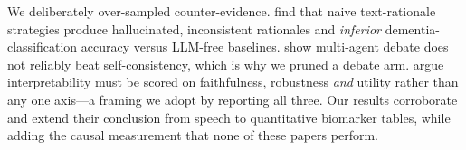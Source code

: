  We deliberately over-sampled counter-evidence.
\citet{anon2026dementiaspeech} find that naive text-rationale strategies produce hallucinated,
inconsistent rationales and \emph{inferior} dementia-classification accuracy versus LLM-free
baselines. \citet{smit2024mad} show multi-agent debate does not reliably beat self-consistency,
which is why we pruned a debate arm. \citet{lyu2024faithfulsurvey} argue interpretability must be
scored on faithfulness, robustness \emph{and} utility rather than any one axis---a framing we adopt
by reporting all three. Our results corroborate \citet{anon2026dementiaspeech} and extend their
conclusion from speech to quantitative biomarker tables, while adding the causal measurement that
none of these papers perform.
